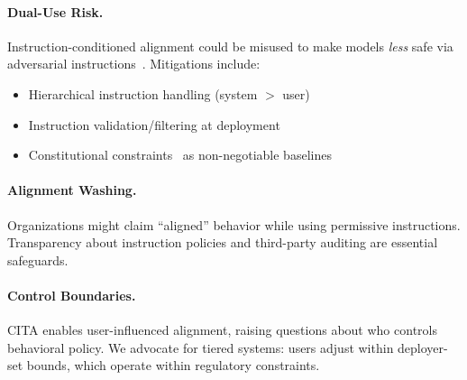 \paragraph{Dual-Use Risk.} Instruction-conditioned alignment could be misused to make models \textit{less} safe via adversarial instructions~\cite{zou2023universal,carlini2023aligned,pace2024west}. Mitigations include:
\begin{itemize}[leftmargin=*,itemsep=1pt]
    \item Hierarchical instruction handling (system $>$ user)
    \item Instruction validation/filtering at deployment
    \item Constitutional constraints~\cite{bai2022constitutional} as non-negotiable baselines
\end{itemize}

\paragraph{Alignment Washing.} Organizations might claim ``aligned'' behavior while using permissive instructions. Transparency about instruction policies and third-party auditing are essential safeguards.

\paragraph{Control Boundaries.} CITA enables user-influenced alignment, raising questions about who controls behavioral policy. We advocate for tiered systems: users adjust within deployer-set bounds, which operate within regulatory constraints.










%
%

